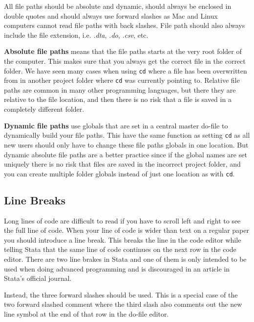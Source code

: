 All file paths should be absolute and dynamic, should always be enclosed in double quotes and should
always use forward slashes as Mac and Linux computers cannot read file paths with back slashes. File path 
should also always include the file extension, i.e. \textit{.dta}, \textit{.do}, \textit{.csv}, etc.

\textbf{Absolute file paths} means that the file paths starts at the very root folder of the computer. This makes sure that
you always get the correct file in the correct folder. We have seen many cases when using \verb|cd| where
a file has been overwritten from in another project folder where \verb|cd| was currently pointing to.
Relative file paths are common in many other programming languages, but there they are relative to the
file location, and then there is no risk that a file is saved in a completely different folder.

\textbf{Dynamic file paths} use globals that are set in a central master do-file to dynamically build your file
paths. This have the same function as setting \verb|cd| as all new users should only have to change these
file paths globals in one location. But dynamic absolute file paths are a better practice since if the
global names are set uniquely there is no risk that files are saved in the incorrect project folder, and
you can create multiple folder globals instead of just one location as with \verb|cd|.


\subsection{Line Breaks}

Long lines of code are difficult to read if you have to scroll left and right to see the full line of code. 
When your line of code is wider than text on a regular paper you should introduce a line break. This breaks 
the line in the code editor while telling Stata that the same line of code continues on the next row in the 
code editor. There are two line brakes in Stata and one of them is only intended to be used when doing 
advanced programming and is discouraged in an article in Stata's official journal.\cite{cox2005styleguide}

Instead, the three forward slashes should be used. This is a special case of the two forward slashed comment 
where the third slash also comments out the new line symbol at the end of that row in the do-file editor.

